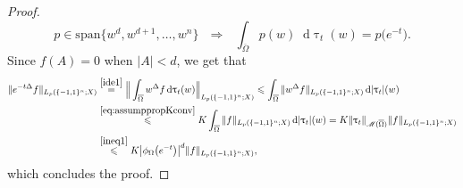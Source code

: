 \documentclass[11pt,reqno]{amsart}
\renewcommand{\leq}{\leqslant}
\newcommand{\1}{\mathbf 1}
\theoremstyle{remark}
\renewcommand{\tau}{\uptau}
\newcommand*\diff{\mathop{}\!\mathrm{d}}
\newcommand{\ms}{\mathscr}
\begin{document}
\begin{proof}
\begin{equation}
p\in\mathrm{span}\{w^d,w^{d+1},\ldots,w^n\} \ \ \ \Longrightarrow \ \ \ \int_{\overline{\Omega}} p(w)\diff\tau_t(w) = p\big(e^{-t}\big).
\end{equation}
Since $\widehat{f}(A)=0$ when $|A|<d$, we get that
\begin{equation}
\begin{split}
\|e^{-t\Delta}f\|_{L_p(\{-1,1\}^n;X)}& \stackrel{\eqref{ide1}}{=} \Big\| \int_{\overline{\Omega}} w^\Delta f \diff\tau_t(w)\Big\|_{L_p(\{-1,1\}^n;X)} \leq \int_{\overline{\Omega}} \|w^\Delta f\|_{L_p(\{-1,1\}^n;X)} \diff|\tau_t|(w)
\\ & \stackrel{\eqref{eq:assumppropKconv}}{\leq} K \int_{\overline{\Omega}} \|f\|_{L_p(\{-1,1\}^n;X)} \diff|\tau_t|(w) = K\|\tau_t\|_{\ms{M}(\overline{\Omega})} \|f\|_{L_p(\{-1,1\}^n;X)}
\\ & \stackrel{\eqref{ineq1}}{\leq} K\big| \phi_\Omega\big(e^{-t}\big)\big|^d \|f\|_{L_p(\{-1,1\}^n;X)},
\end{split}
\end{equation}
which concludes the proof.
\end{proof}
\end{document}
